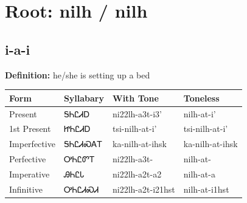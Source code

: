 \documentclass{article}%
\begin{document}
%
\normalsize%
\section*{Root: nilh / nilh}%
\subsection*{i-a-i}%
\textbf{Definition: }%
he/she is setting up a bed%
\\[0.5em]%
\begin{tabular}{|l|l|l|l|}%
\hline%
\textbf{Form}&\textbf{Syllabary}&\textbf{With Tone}&\textbf{Toneless}\\%
\hline%
Present&ᎦᏂᏝᏗᎠ&ni22lh{-}a3t{-}i3'&nilh{-}at{-}i'\\%
1st Present&ᏥᏂᏝᏗᎠ&tsi{-}nilh{-}at{-}i'&tsi{-}nilh{-}at{-}i'\\%
Imperfective&ᎦᏂᏝᏗᏍᎪᎢ&ka{-}nilh{-}at{-}ihsk&ka{-}nilh{-}at{-}ihsk\\%
Perfective&ᎤᏂᏝᏛᎢ&ni22lh{-}a3t{-}&nilh{-}at{-}\\%
Imperative&ᎯᏂᏝᏓ&ni22lh{-}a2t{-}a2&nilh{-}at{-}a\\%
Infinitive&ᎤᏂᏝᏗᏍᏗ&ni22lh{-}a2t{-}i21hst&nilh{-}at{-}i1hst\\%
\hline%
\end{tabular}%
\\[1em]%
\end{document}
